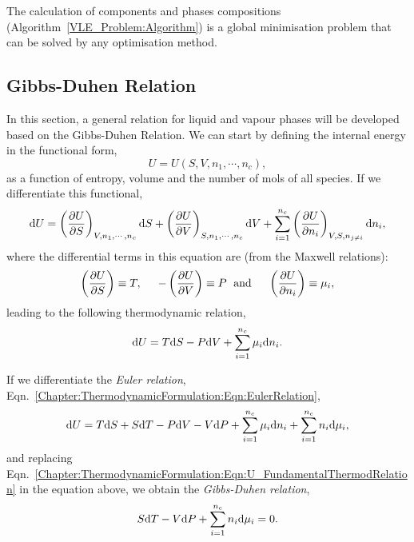 The calculation of components and phases compositions (Algorithm~\ref{VLE_Problem:Algorithm}) is a global minimisation problem that can be solved by any optimisation method. %


\subsection{Gibbs-Duhen Relation}\label{Chapter:ThermodynamicFormulation:Section:GibbsDuhen}
In this section, a general relation for liquid and vapour phases will be developed based on the Gibbs-Duhen Relation. We can start by defining the internal energy in the functional form,
\begin{displaymath}
   U = U\left(S, V, n_{1}, \cdots, n_{c}\right),
\end{displaymath} 
as a function of entropy, volume and the number of mols of all species. If we differentiate this functional,
\begin{displaymath}
   \mathrm{d} U = \left(\displaystyle\frac{\partial U}{\partial S}\right)_{V,n_{1},\cdots,n_{c}}\mathrm{d} S + \left(\displaystyle\frac{\partial U}{\partial V}\right)_{S,n_{1},\cdots,n_{c}}\mathrm{d} V + \sum\limits_{i=1}^{n_{c}} \left(\displaystyle\frac{\partial U}{\partial n_{i}}\right)_{V,S,n_{j\ne i}}\mathrm{d} n_{i},
\end{displaymath}
where the differential terms in this equation are (from the Maxwell relations):
\begin{displaymath}
    \left(\displaystyle\frac{\partial U}{\partial S}\right) \equiv T, \hspace{.5cm} -\left(\displaystyle\frac{\partial U}{\partial V}\right) \equiv P \hspace{.1cm}\text{ and }\hspace{.4cm}  \left(\displaystyle\frac{\partial U}{\partial n_{i}}\right) \equiv \mu_{i},
\end{displaymath}
leading to the following thermodynamic relation,
\begin{equation}
     \mathrm{d} U = T\mathrm{d} S - P\mathrm{d} V + \sum\limits_{i=1}^{n_{c}}\mu_{i}\mathrm{d} n_{i}.\label{Chapter:ThermodynamicFormulation:Eqn:U_FundamentalThermodRelation}
\end{equation}

If we differentiate the {\it Euler relation}, Eqn.~\ref{Chapter:ThermodynamicFormulation:Eqn:EulerRelation},
\begin{displaymath}
  \mathrm{d} U = T\mathrm{d} S + S\mathrm{d} T - P\mathrm{d} V - V\mathrm{d} P + \sum\limits_{i=1}^{n_{c}}\mu_{i}\mathrm{d} n_{i} + \sum\limits_{i=1}^{n_{c}} n_{i}\mathrm{d}\mu_{i},
\end{displaymath}
and replacing Eqn.~\ref{Chapter:ThermodynamicFormulation:Eqn:U_FundamentalThermodRelation} in the equation above, we obtain the {\it Gibbs-Duhen relation},
\begin{equation}
   S\mathrm{d} T -V\mathrm{d} P + \sum\limits_{i=1}^{n_{c}} n_{i}\mathrm{d}\mu_{i} = 0.\label{Chapter:ThermodynamicFormulation:Eqn:GibbsDuhenRelation}
\end{equation}

